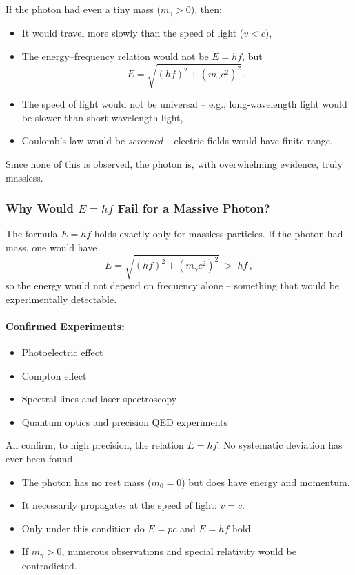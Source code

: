 \begin{tcolorbox}[hypobox, title={What if the Photon Had a Mass?}]
	\label{box:was wäre wenn}
	If the photon had even a tiny mass ($m_\gamma > 0$), then:
	\begin{itemize}
		\item It would travel more slowly than the speed of light ($v < c$),
		\item The energy–frequency relation would not be $E=hf$, but
		$$
		E = \sqrt{(hf)^2 + (m_\gamma c^2)^2}\,,
		$$
		\item The speed of light would not be universal – e.g., long-wavelength light would be slower than short-wavelength light,
		\item Coulomb’s law would be \emph{screened} – electric fields would have finite range.
	\end{itemize}
	Since none of this is observed, the photon is, with overwhelming evidence, truly massless.
\end{tcolorbox}
\vspace{1em}
\newpage
\noindent
\subsubsection{Why Would \( E = h f \) Fail for a Massive Photon?}

The formula $E = hf$ holds exactly only for massless particles. If the photon had mass, one would have
$$
E = \sqrt{(hf)^2 + (m_\gamma c^2)^2} \; > \; hf\,,
$$
so the energy would not depend on frequency alone – something that would be experimentally detectable.

\paragraph{Confirmed Experiments:}
\begin{itemize}
	\item Photoelectric effect
	\item Compton effect
	\item Spectral lines and laser spectroscopy
	\item Quantum optics and precision QED experiments
\end{itemize}
All confirm, to high precision, the relation $E = hf$. No systematic deviation has ever been found.
\vspace{1em}
\begin{tcolorbox}[physikbox, title=Conclusion: Why the Photon Is Massless]
	\label{box:Warum das Photon}
	\begin{itemize}
		\item The photon has no rest mass ($m_0 = 0$) but does have energy and momentum.
		\item It necessarily propagates at the speed of light: $v = c$.
		\item Only under this condition do $E = pc$ and $E = hf$ hold.
		\item If $m_\gamma > 0$, numerous observations and special relativity would be contradicted.
	\end{itemize}
\end{tcolorbox}
\vspace{1em}

